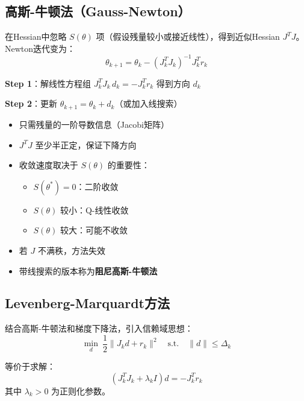 \subsection{高斯-牛顿法（Gauss-Newton）}

\begin{conceptbox}[高斯-牛顿法原理]
在Hessian中忽略 $S(\theta)$ 项（假设残量较小或接近线性），得到近似Hessian $J^T J$。Newton迭代变为：
\[
\theta_{k+1} = \theta_k - (J_k^T J_k)^{-1} J_k^T r_k
\]
\end{conceptbox}

\begin{algobox}[高斯-牛顿法算法]
\textbf{Step 1}：解线性方程组 $J_k^T J_k \, d_k = -J_k^T r_k$ 得到方向 $d_k$

\textbf{Step 2}：更新 $\theta_{k+1} = \theta_k + d_k$（或加入线搜索）
\end{algobox}

\begin{notebox}[高斯-牛顿法的特点]
\begin{itemize}[itemsep=0.3em]
    \item 只需残量的一阶导数信息（Jacobi矩阵）
    \item $J^T J$ 至少半正定，保证下降方向
    \item 收敛速度取决于 $S(\theta)$ 的重要性：
    \begin{itemize}
        \item $S(\theta^*) = 0$：二阶收敛
        \item $S(\theta)$ 较小：Q-线性收敛
        \item $S(\theta)$ 较大：可能不收敛
    \end{itemize}
    \item 若 $J$ 不满秩，方法失效
    \item 带线搜索的版本称为\textbf{阻尼高斯-牛顿法}
\end{itemize}
\end{notebox}

\subsection{Levenberg-Marquardt方法}

\begin{conceptbox}[LM方法原理]
结合高斯-牛顿法和梯度下降法，引入信赖域思想：
\[
\min_d\ \frac{1}{2}\|J_k d + r_k\|^2 \quad \text{s.t.}\quad \|d\| \leq \Delta_k
\]

等价于求解：
\[
(J_k^T J_k + \lambda_k I) d = -J_k^T r_k
\]
其中 $\lambda_k > 0$ 为正则化参数。
\end{conceptbox}

